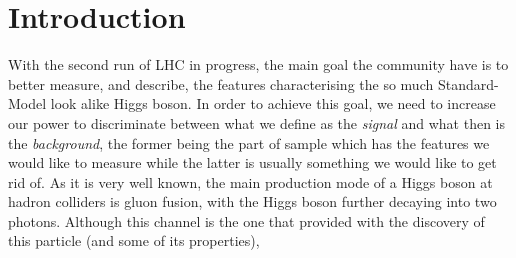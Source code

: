 \section{Introduction } 
With the second run of LHC in progress, the main goal the community have is to
better measure, and describe, the features characterising the so much Standard-Model
look alike Higgs boson. In order to achieve this goal, we need to increase our power
to discriminate between what we define as the {\it signal} and what then is the {\it background}, the former being the part of sample which has the features we would like to measure while the latter is usually something we would like to get rid of.
As it is very well known, the main production mode of a Higgs boson at
hadron colliders is gluon fusion, with the Higgs boson further decaying into two photons.
Although this channel is the one that provided with the discovery of this particle 
(and some of its properties),  